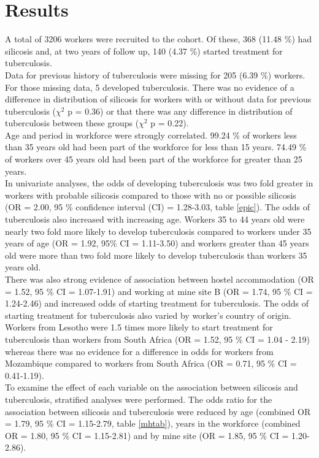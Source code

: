 \documentclass[11pt,a4paper,twoside]{article}\usepackage{graphicx, color}
\begin{document}
\section{Results}
A total of 3206 workers were recruited to the cohort. Of these, 368 (11.48 \%) had silicosis and, at two years of follow up, 140 (4.37 \%) started treatment for tuberculosis.\\ \indent
Data for previous history of tuberculosis were missing for 205 (6.39 \%) workers. 
For those missing data, 5 developed tuberculosis. 
There was no evidence of a difference in distribution of silicosis for workers with or without data for previous tuberculosis ($\chi^2$ p = 0.36) or that there was any difference in distribution of tuberculosis between these groups ($\chi^2$ p = 0.22). \\ \indent
Age and period in workforce were strongly correlated. 
99.24 \% of workers less than 35 years old had been part of the workforce for less than 15 years. 
74.49 \% of workers over 45 years old had been part of the workforce for greater than 25 years. \\ \indent 
In univariate analyses, the odds of developing tuberculosis was two fold greater in workers with probable silicosis compared to those with no or possible silicosis (OR = 2.00, 95 \% confidence interval (CI) = 1.28-3.03, table \ref{epic}). 
The odds of tuberculosis also increased with increasing age. 
Workers 35 to 44 years old were nearly two fold more likely to develop tuberculosis compared to workers under 35 years of age (OR = 1.92, 95\% CI = 1.11-3.50) and workers greater than 45 years old were more than two fold more likely to develop tuberculosis than workers 35 years old.\\ \indent
There was also strong evidence of association between hostel accommodation (OR = 1.52, 95 \% CI = 1.07-1.91) and working at mine site B (OR = 1.74, 95 \% CI = 1.24-2.46) and increased odds of starting treatment for tuberculosis. 
The odds of starting treatment for tuberculosis also varied by worker's  country of origin. Workers from Lesotho were 1.5 times more likely to start treatment for tuberculosis than workers from South Africa (OR = 1.52, 95 \% CI = 1.04 - 2.19) whereas there was no evidence for a difference in odds for workers from Mozambique compared to workers from South Africa (OR = 0.71, 95 \% CI = 0.41-1.19).\\ \indent
To examine the effect of each variable on the association between silicosis and tuberculosis, stratified analyses were performed. 
The odds ratio for the association between silicosis and tuberculosis were reduced by age (combined OR = 1.79, 95 \% CI = 1.15-2.79, table \ref{mhtab}), years in the workforce (combined OR = 1.80, 95 \% CI = 1.15-2.81) and by mine site (OR = 1.85, 95 \% CI = 1.20-2.86). 
\end{document}
